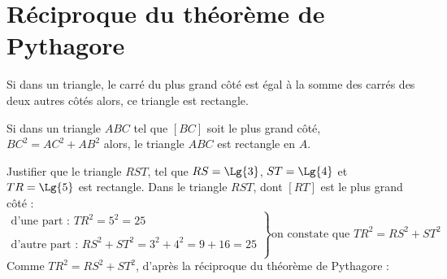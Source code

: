 \section{Réciproque du théorème de Pythagore}

\begin{propriete}
    Si dans un triangle, le carré du plus grand côté est égal à la somme des carrés des deux autres côtés alors, ce triangle est rectangle.
\end{propriete}

\begin{propriete}
    Si dans un triangle $ABC$ tel que $[BC]$ soit le plus grand côté, $BC^2=AC^2+AB^2$ alors, le triangle $ABC$ est rectangle en $A$.
\end{propriete}

\begin{methode*1}
    \exercice
    Justifier que le triangle $RST$, tel que $RS=\Lg{3}$, $ST=\Lg{4}$ et $TR=\Lg{5}$ est rectangle.
    \correction
    Dans le triangle $RST$, dont $[RT]$ est le plus grand côté : 
    $$\left.\begin{array}{l}
    \text{d'une part : }TR^2=5^2=25\\
    \\
    \text{d'autre part : }RS^2+ST^2=3^2+4^2=9+16=25\\
    \end{array}
    \right\rbrace\text{on constate que }TR^2=RS^2+ST^2$$
    Comme $TR^2=RS^2+ST^2$, d'après la réciproque du théorème de Pythagore :\\
\end{methode*1}
